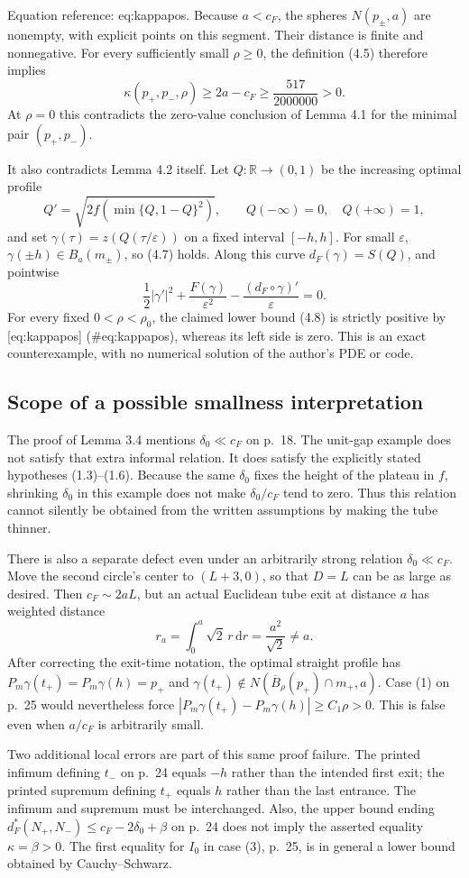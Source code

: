 \documentclass[10pt]{article}
\begin{document}
Equation reference: eq:kappapos. Because \(a<c_F\), the spheres \(N(p_\pm,a)\) are nonempty, with explicit points on this segment. Their distance is finite and nonnegative. For every sufficiently small \(\rho\geq0\), the definition (4.5) therefore implies \[
 \kappa(p_+,p_-,\rho)\geq2a-c_F
 \geq \frac{517}{2000000}>0.\] At \(\rho=0\) this contradicts the zero-value conclusion of Lemma 4.1 for the minimal pair \((p_+,p_-)\).\par
It also contradicts Lemma 4.2 itself. Let \(Q:\mathbb R\to(0,1)\) be the increasing optimal profile \[Q'=\sqrt{2f(\min\{Q,1-Q\}^2)},\qquad Q(-\infty)=0,\quad Q(+\infty)=1,\] and set \(\gamma(\tau)=z(Q(\tau/\varepsilon))\) on a fixed interval \([-h,h]\). For small \(\varepsilon\), \(\gamma(\pm h)\in B_a(m_\pm)\), so (4.7) holds. Along this curve \(d_F(\gamma)=S(Q)\), and pointwise \[\frac12|\gamma'|^2+\frac{F(\gamma)}{\varepsilon^2}
       -\frac{(d_F\circ\gamma)'}{\varepsilon}=0.\] For every fixed \(0<\rho<\rho_0\), the claimed lower bound (4.8) is strictly positive by [eq:kappapos] (\#eq:kappapos), whereas its left side is zero. This is an exact counterexample, with no numerical solution of the author’s PDE or code.\par
\subsection*{Scope of a possible smallness interpretation}
The proof of Lemma 3.4 mentions \(\delta_0\ll c_F\) on p. 18. The unit-gap example does not satisfy that extra informal relation. It does satisfy the explicitly stated hypotheses (1.3)–(1.6). Because the same \(\delta_0\) fixes the height of the plateau in \(f\), shrinking \(\delta_0\) in this example does not make \(\delta_0/c_F\) tend to zero. Thus this relation cannot silently be obtained from the written assumptions by making the tube thinner.\par
There is also a separate defect even under an arbitrarily strong relation \(\delta_0\ll c_F\). Move the second circle’s center to \((L+3,0)\), so that \(D=L\) can be as large as desired. Then \(c_F\sim2aL\), but an actual Euclidean tube exit at distance \(a\) has weighted distance \[r_a=\int_0^a\sqrt2\,r\,\mathrm dr=\frac{a^2}{\sqrt2}\neq a.\] After correcting the exit-time notation, the optimal straight profile has \(P_m\gamma(t_+)=P_m\gamma(h)=p_+\) and \(\gamma(t_+)\notin N(\overline B_\rho(p_+)\cap m_+,a)\). Case (1) on p. 25 would nevertheless force \(|P_m\gamma(t_+)-P_m\gamma(h)|\geq C_1\rho>0\). This is false even when \(a/c_F\) is arbitrarily small.\par
Two additional local errors are part of this same proof failure. The printed infimum defining \(t_-\) on p. 24 equals \(-h\) rather than the intended first exit; the printed supremum defining \(t_+\) equals \(h\) rather than the last entrance. The infimum and supremum must be interchanged. Also, the upper bound ending \(d_F^*(N_+,N_-)\leq c_F-2\delta_0+\beta\) on p. 24 does not imply the asserted equality \(\kappa=\beta>0\). The first equality for \(I_0\) in case (3), p. 25, is in general a lower bound obtained by Cauchy–Schwarz.\par
\end{document}
